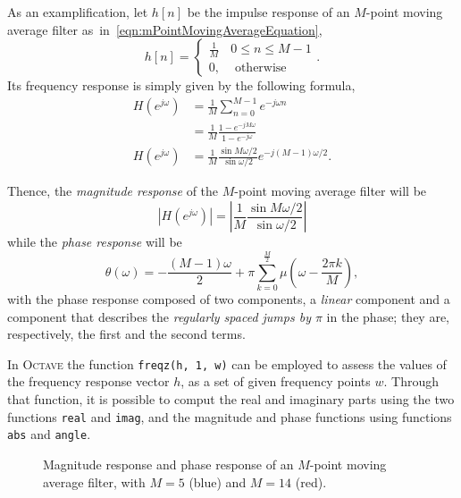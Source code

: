 \documentclass[\documentfontsize, twocolumn]{\classname}
\begin{document}
As an examplification, let $h[n]$ be the impulse response of an $M$-point moving average filter as~in~\ref{eqn:mPointMovingAverageEquation},
\[
    h[n] =
    \left\{
        \begin{array}{ll}
            \frac 1 M & 0 \leq n \leq M-1\\
            0, & \mbox{ otherwise }
        \end{array}
    \right..
\]
Its frequency response is simply given by the following formula,
\begin{align*}
    H(e^{j\omega})
    &= \frac 1 M \sum_{n=0}^{M-1} e^{-j\omega n}\\
    &= \frac 1 M \frac{
        1 - e^{-jM\omega}
    } {
        1 - e^{-j\omega}
    }\\
    H(e^{j\omega})
    &= \frac 1 M \frac{
        \sin{M\omega/2}
    } {
        \sin{\omega/2}
    } e^{-j(M-1)\omega/2}.
\end{align*}

Thence, the \emph{magnitude response} of the $M$-point moving average filter will be
\begin{equation}\label{eqn:mPointMovingAverageFilterMagnitudeReponse}
    \left|H(e^{j\omega})\right|
    = \left|\frac 1 M \frac{
        \sin{M\omega/2}
    } {
        \sin{\omega/2}
    }\right|
\end{equation}
while the \emph{phase response} will be
\begin{equation}\label{eqn:mPointMovingAverageFilterPhaseReponse}
    \theta(\omega) =
    -\frac{
        (M-1)\omega
    } {
        2
    }
    + \pi \sum_{k=0}^{\frac M 2} \mu\left(\omega - \frac{2\pi k}{M}\right),
\end{equation}
with the phase response composed of two components, a \emph{linear} component and a component that describes the \emph{regularly spaced jumps by $\pi$} in the phase; they are, respectively, the first and the second terms.

In \textsc{Octave} the function \texttt{freqz(h, 1, w)} can be employed to assess the values of the frequency response vector $h$, as a set of given frequency points $w$. Through that function, it is possible to comput the real and imaginary parts using the two functions \texttt{real} and \texttt{imag}, and the magnitude and phase functions using functions \texttt{abs} and \texttt{angle}.

\begin{figure*}[ht]
\begin{center}
\scalebox{0.6}{
    
}\caption{Magnitude response and phase response of an $M$-point moving average filter, with $M=5$ (blue) and $M=14$ (red).}\label{oct:mPointMovingAverageFilterPlot}
\end{center}
\end{figure*}
\end{document}
